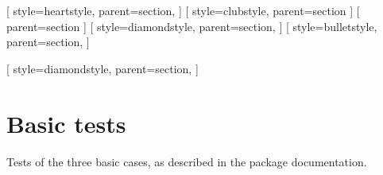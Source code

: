 \usepackage{amsmath} %
\usepackage{amssymb}
\usepackage{tikz} %
\usetikzlibrary{cd} %
\usepackage[auto-qed]{keytheorems}
\usepackage{hyperref}
\usepackage{kantlipsum} %
\newcommand{\kantgray}[2]{{\color{gray}\kant*[#1][#2]}}


[
    style=heartstyle,
    parent=section,
    ]
[
    style=clubstyle,
    parent=section
    ]
[ %
    parent=section
    ]
[
    style=diamondstyle,
    parent=section,
    ]
[
    style=bulletstyle,
    parent=section,
    ]

[
    style=diamondstyle,
    parent=section,
    ]
\newcommand{\testtype}[2]{\texttt{#1}:%
  #2}
\newcommand{\makeoutertest}[3]{
  \begin{test}
    \testtype{#1}{#2}
    #3
  \end{test}
}
\newcommand{\maketest}[3]{
  \makeoutertest{#1}{#2}{
    \begin{#1}
      #3
    \end{#1}
  }
}









\section{Basic tests}
Tests of the three basic cases, as described in the package documentation.

